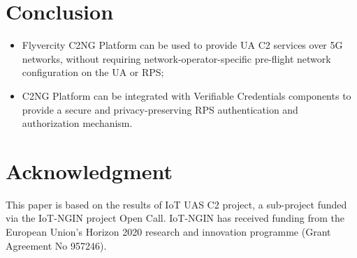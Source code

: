 \documentclass[a4paper,conference]{IEEEtran}
\begin{document}
\section{Conclusion}

\begin{itemize}
\item Flyvercity C2NG Platform can be used to provide UA C2 services over 5G networks, without requiring network-operator-specific pre-flight network configuration on the UA or RPS;
\item C2NG Platform can be integrated with Verifiable Credentials components to provide a secure and privacy-preserving RPS authentication and authorization mechanism.
\end{itemize}

\section*{Acknowledgment}

This paper is based on the results of IoT UAS C2 project, a sub-project funded via the IoT-NGIN project Open Call. IoT-NGIN has received funding from the European Union’s Horizon 2020 research and innovation programme (Grant Agreement No 957246).

\end{document}
